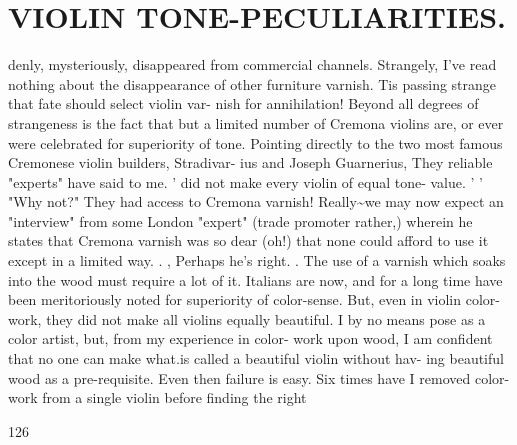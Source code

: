 \documentclass{article}
\begin{document}
\section*{VIOLIN TONE-PECULIARITIES.}
denly, mysteriously, disappeared from commercial channels. Strangely, I've read nothing about the disappearance of other furniture varnish. Tis passing strange that fate should select violin var- nish for annihilation! Beyond all degrees of strangeness is the fact that but a limited number of Cremona violins are, or ever were celebrated for superiority of tone. Pointing directly to the two most famous Cremonese violin builders, Stradivar- ius and Joseph Guarnerius, They reliable "experts" have said to me. ' did not make every violin of equal tone- value. ' ' "Why not?" They had access to Cremona varnish! Really\textasciitilde{}we may now expect an "interview" from some London "expert" (trade promoter rather,) wherein he states that Cremona varnish was so dear (oh!) that none could afford to use it except in a limited way. . , Perhaps he's right. . The use of a varnish which soaks into the wood must require a lot of it. Italians are now, and for a long time have been meritoriously noted for superiority of color-sense. But, even in violin color-work, they did not make all violins equally beautiful. I by no means pose as a color artist, but, from my experience in color- work upon wood, I am confident that no one can make what.is called a beautiful violin without hav- ing beautiful wood as a pre-requisite. Even then failure is easy. Six times have I removed color- work from a single violin before finding the right

126
\end{document}
